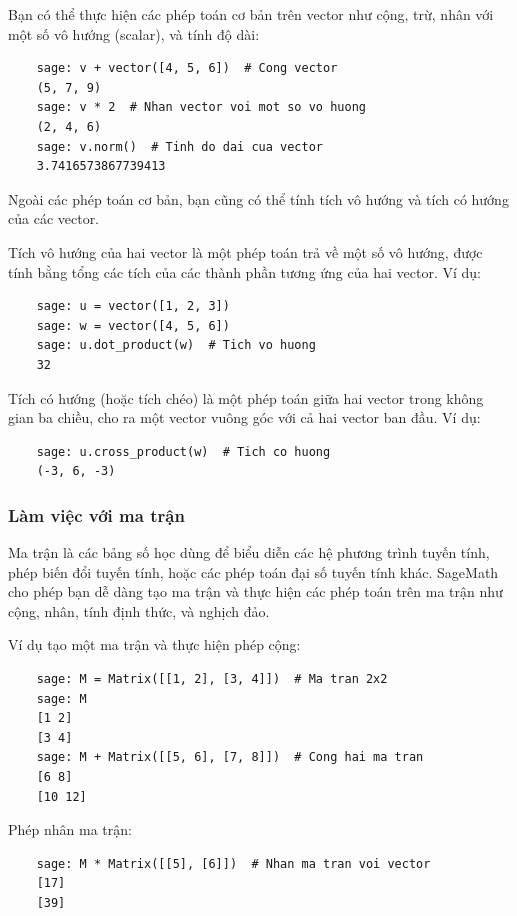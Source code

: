 Bạn có thể thực hiện các phép toán cơ bản trên vector như cộng, trừ, nhân với một số vô hướng (scalar), và tính độ dài:

\begin{lstlisting}
	sage: v + vector([4, 5, 6])  # Cong vector
	(5, 7, 9)
	sage: v * 2  # Nhan vector voi mot so vo huong
	(2, 4, 6)
	sage: v.norm()  # Tinh do dai cua vector
	3.7416573867739413
\end{lstlisting}

Ngoài các phép toán cơ bản, bạn cũng có thể tính tích vô hướng và tích có hướng của các vector. 

Tích vô hướng của hai vector là một phép toán trả về một số vô hướng, được tính bằng tổng các tích của các thành phần tương ứng của hai vector. Ví dụ:

\begin{lstlisting}
	sage: u = vector([1, 2, 3])
	sage: w = vector([4, 5, 6])
	sage: u.dot_product(w)  # Tich vo huong
	32
\end{lstlisting}

Tích có hướng (hoặc tích chéo) là một phép toán giữa hai vector trong không gian ba chiều, cho ra một vector vuông góc với cả hai vector ban đầu. Ví dụ:

\begin{lstlisting}
	sage: u.cross_product(w)  # Tich co huong
	(-3, 6, -3)
\end{lstlisting}


\subsubsection{Làm việc với ma trận}

Ma trận là các bảng số học dùng để biểu diễn các hệ phương trình tuyến tính, phép biến đổi tuyến tính, hoặc các phép toán đại số tuyến tính khác. SageMath cho phép bạn dễ dàng tạo ma trận và thực hiện các phép toán trên ma trận như cộng, nhân, tính định thức, và nghịch đảo.

Ví dụ tạo một ma trận và thực hiện phép cộng:

\begin{lstlisting}
	sage: M = Matrix([[1, 2], [3, 4]])  # Ma tran 2x2
	sage: M
	[1 2]
	[3 4]
	sage: M + Matrix([[5, 6], [7, 8]])  # Cong hai ma tran
	[6 8]
	[10 12]
\end{lstlisting}

Phép nhân ma trận:

\begin{lstlisting}
	sage: M * Matrix([[5], [6]])  # Nhan ma tran voi vector
	[17]
	[39]
\end{lstlisting}

